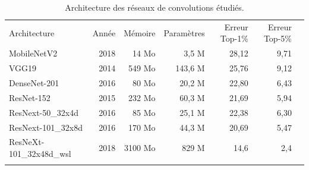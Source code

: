 \begin{table}[hbtp]
    \centering
    \begin{tabular}{|l|r|r|r|r|r|r|}
        \hhline{------}
        Architecture             & Année & Mémoire & Paramètres & Erreur Top-1\% & Erreur Top-5\% \\
        \hhline{=:=:=:=:=:=} %
        MobileNetV2              & 2018  & 14 Mo   & 3,5 M      & 28,12          & 9,71           \\ \hline
        VGG19                    & 2014  & 549 Mo  & 143,6 M    & 25,76          & 9,12           \\ \hline
        DenseNet-201             & 2016  & 80 Mo   & 20,2 M     & 22,80          & 6,43           \\ \hline
        ResNet-152               & 2015  & 232 Mo  & 60,3 M     & 21,69          & 5,94           \\ \hline
        ResNext-50\_32x4d        & 2016  & 85 Mo   & 25,1 M     & 22,38          & 6,30           \\ \hline
        ResNext-101\_32x8d       & 2016  & 170 Mo  & 44,3 M     & 20,69          & 5,47          \\ \hline
        ResNeXt-101\_32x48d\_wsl & 2018  & 3100 Mo & 829 M      & 14,6           &     2,4           \\
        \hhline{------}
    \end{tabular}
    \caption{Architecture des réseaux de convolutions étudiés.}
    \label{tab:deep_models}
\end{table}

